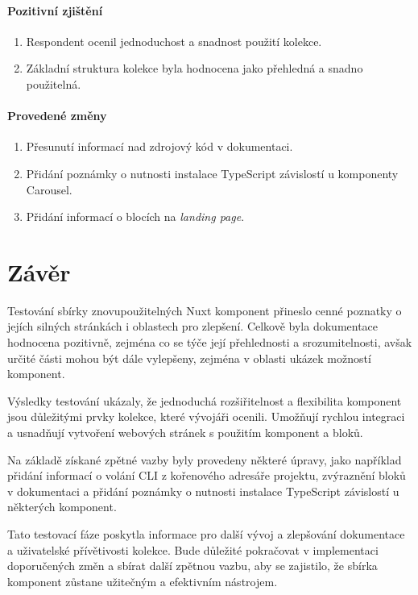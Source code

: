 \paragraph{Pozitivní zjištění}
\begin{enumerate}
  \item Respondent ocenil jednoduchost a snadnost použití kolekce.
  \item Základní struktura kolekce byla hodnocena jako přehledná a snadno použitelná.
\end{enumerate}

\paragraph{Provedené změny}
\begin{enumerate}
  \item Přesunutí informací nad zdrojový kód v dokumentaci.
  \item Přidání poznámky o nutnosti instalace TypeScript závislostí u komponenty Carousel.
  \item Přidání informací o blocích na \emph{landing page}.
\end{enumerate}

\section{Závěr}
Testování sbírky znovupoužitelných Nuxt komponent přineslo cenné poznatky o jejích silných stránkách i oblastech pro zlepšení. Celkově byla dokumentace hodnocena pozitivně, zejména co se týče její přehlednosti a srozumitelnosti, avšak určité části mohou být dále vylepšeny, zejména v oblasti ukázek možností komponent.

Výsledky testování ukázaly, že jednoduchá rozšiřitelnost a flexibilita komponent jsou důležitými prvky kolekce, které vývojáři ocenili. Umožňují rychlou integraci a usnadňují vytvoření webových stránek s použitím komponent a bloků.

Na základě získané zpětné vazby byly provedeny některé úpravy, jako například přidání informací o volání CLI z kořenového adresáře projektu, zvýraznění bloků v dokumentaci a přidání poznámky o nutnosti instalace TypeScript závislostí u některých komponent.

Tato testovací fáze poskytla informace pro další vývoj a zlepšování dokumentace a uživatelské přívětivosti kolekce. Bude důležité pokračovat v implementaci doporučených změn a sbírat další zpětnou vazbu, aby se zajistilo, že sbírka komponent zůstane užitečným a efektivním nástrojem.
